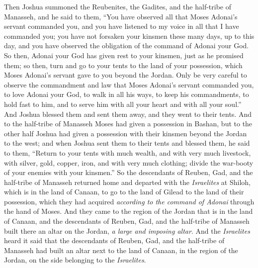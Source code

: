 \begin{biblechapter} %
 Then Joshua summoned the Reubenites, the Gadites, and the half-tribe of Manasseh,
\verse and he said to them, “You have observed all that Moses Adonai’s servant commanded you, and you have listened to my voice in all that I have commanded you;
\verse you have not forsaken your kinsmen these many days, up to this day, and you have observed the obligation of the command of Adonai your God.
\verse So then, Adonai your God has given rest to your kinsmen, just as he promised them; so then, turn and go to your tents to the land of your possession, which Moses Adonai’s servant gave to you beyond the Jordan.
\verse Only be very careful to observe the commandment and law that Moses Adonai’s servant commanded you, to love Adonai your God, to walk in all his ways, to keep his commandments, to hold fast to him, and to serve him with all your heart and with all your soul.”
\verse And Joshua blessed them and sent them away, and they went to their tents.
\verse And to the half-tribe of Manasseh Moses had given a possession in Bashan, but to the other half Joshua had given a possession with their kinsmen beyond the Jordan to the west; and when Joshua sent them to their tents and blessed them,
\verse he said to them, “Return to your tents with much wealth, and with very much livestock, with silver, gold, copper, iron, and with very much clothing; divide the war-booty of your enemies with your kinsmen.”
\verse So the descendants of Reuben, Gad, and the half-tribe of Manasseh returned home and departed with the \textit{Israelites} at Shiloh, which is in the land of Canaan, to go to the land of Gilead to the land of their possession, which they had acquired \textit{according to the command of Adonai} through the hand of Moses.
\verse And they came to the region of the Jordan that is in the land of Canaan, and the descendants of Reuben, Gad, and the half-tribe of Manasseh built there an altar on the Jordan, \textit{a large and imposing altar}.
\verse And the \textit{Israelites} heard it said that the descendants of Reuben, Gad, and the half-tribe of Manasseh had built an altar next to the land of Canaan, in the region of the Jordan, on the side belonging to the \textit{Israelites}.

\end{biblechapter}
